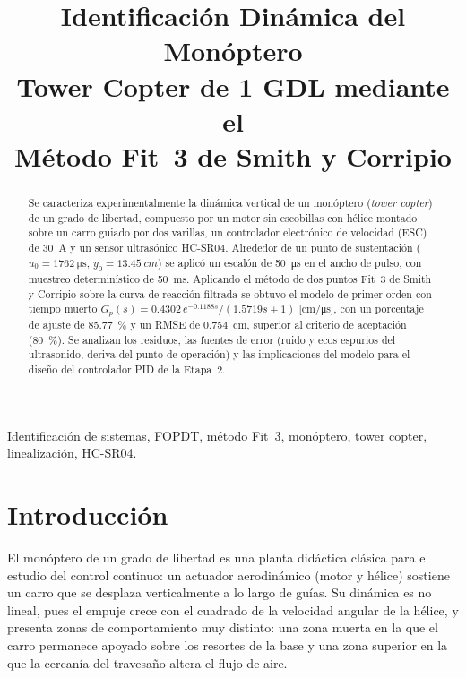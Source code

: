\documentclass[conference,10pt]{IEEEtran}
\begin{document}
\title{Identificación Dinámica del Monóptero\\ Tower Copter de 1 GDL mediante el\\ Método Fit~3 de Smith y Corripio}

\author{
}

\maketitle

\begin{abstract}
Se caracteriza experimentalmente la dinámica vertical de un monóptero (\textit{tower copter}) de un grado de libertad, compuesto por un motor sin escobillas con hélice montado sobre un carro guiado por dos varillas, un controlador electrónico de velocidad (ESC) de \SI{30}{A} y un sensor ultrasónico HC-SR04. Alrededor de un punto de sustentación ($u_0=\SI{1762}{\micro\second}$, $y_0=\SI{13.45}{cm}$) se aplicó un escalón de \SI{50}{\micro\second} en el ancho de pulso, con muestreo determinístico de \SI{50}{ms}. Aplicando el método de dos puntos Fit~3 de Smith y Corripio sobre la curva de reacción filtrada se obtuvo el modelo de primer orden con tiempo muerto $G_p(s)=0.4302\,e^{-0.1188s}/(1.5719s+1)$ [cm/\si{\micro\second}], con un porcentaje de ajuste de \SI{85.77}{\percent} y un RMSE de \SI{0.754}{cm}, superior al criterio de aceptación (\SI{80}{\percent}). Se analizan los residuos, las fuentes de error (ruido y ecos espurios del ultrasonido, deriva del punto de operación) y las implicaciones del modelo para el diseño del controlador PID de la Etapa~2.
\end{abstract}

\begin{IEEEkeywords}
Identificación de sistemas, FOPDT, método Fit~3, monóptero, tower copter, linealización, HC-SR04.
\end{IEEEkeywords}

\section{Introducción}
El monóptero de un grado de libertad es una planta didáctica clásica para el estudio del control continuo: un actuador aerodinámico (motor y hélice) sostiene un carro que se desplaza verticalmente a lo largo de guías. Su dinámica es no lineal, pues el empuje crece con el cuadrado de la velocidad angular de la hélice, y presenta zonas de comportamiento muy distinto: una zona muerta en la que el carro permanece apoyado sobre los resortes de la base y una zona superior en la que la cercanía del travesaño altera el flujo de aire.
\end{document}
